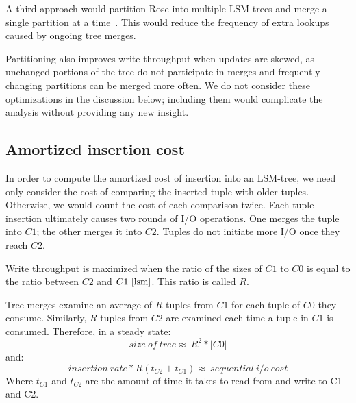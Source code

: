 \documentclass{vldb}
\newcommand{\rows}{Rose\xspace}
\begin{document}

A third approach would partition \rows into multiple LSM-trees and
merge a single partition at a time~\cite{partexp}.  This would reduce
the frequency of extra lookups caused by ongoing tree merges.

Partitioning also improves write throughput when updates are skewed,
as unchanged portions of the tree do not participate in merges and
frequently changing partitions can be merged more often.  We do not
consider these optimizations in the discussion below; including them
would complicate the analysis without providing any new insight.

\subsection{Amortized insertion cost}
In order to compute the amortized cost of insertion into an LSM-tree,
we need only consider the cost of comparing the inserted tuple with
older tuples.  Otherwise, we would count the cost of each comparison
twice.  Each tuple insertion ultimately causes two rounds of I/O
operations.  One merges the tuple into $C1$; the other merges it into
$C2$.  Tuples do not initiate more I/O once they reach $C2$.

Write throughput is maximized when the ratio of the
sizes of $C1$ to $C0$ is equal to the ratio between $C2$ and
$C1~\cite{lsm}$.  This ratio is called $R$.

Tree merges examine an average of $R$ tuples from $C1$ for each tuple
of $C0$ they consume.  Similarly, $R$ tuples from $C2$ are examined
each time a tuple in $C1$ is consumed.  Therefore, in a steady state:
\[size~of~tree\approx~R^2*|C0|\]
and:
\[insertion~rate*R(t_{C2}+t_{C1})\approx~sequential~i/o~cost\]
Where $t_{C1}$ and $t_{C2}$ are the amount of time it takes to read
from and write to C1 and C2.

\end{document}
